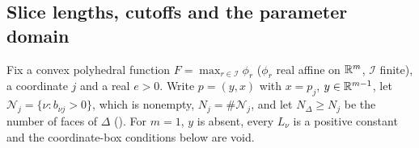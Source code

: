 \subsection{Slice lengths, cutoffs and the parameter domain}\label{sec:plc-slice}

Fix a convex polyhedral function $F=\max_{r\in\mathcal I}\phi_r$ ($\phi_r$ real affine on $\mathbb{R}^m$, $\mathcal I$ finite), a
coordinate $j$ and a real $e>0$. Write $p=(y,x)$ with $x=p_j$, $y\in\mathbb{R}^{m-1}$, let $\mathcal N_j=\{\nu:b_{\nu j}>0\}$, which is
nonempty, $N_j=\#\mathcal N_j$, and let $N_\Delta\ge N_j$ be the number of faces of $\Delta$ (). For
$m=1$, $y$ is absent, every $L_\nu$ is a positive constant and the coordinate-box conditions below are void.

